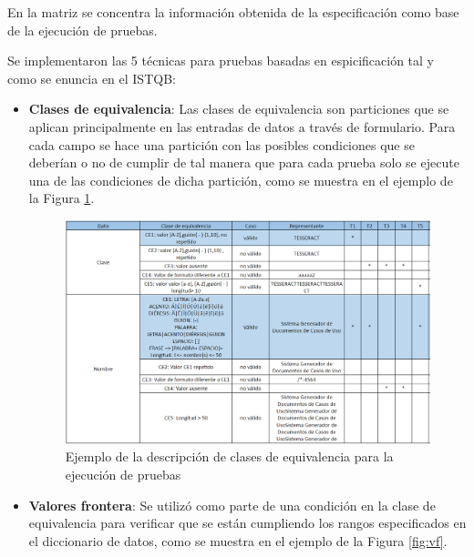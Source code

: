 En la matriz se concentra la información obtenida de la especificación como base de la ejecución de pruebas.\\

\newpage

Se implementaron las 5 técnicas para pruebas basadas en espicificación tal y como se enuncia en el ISTQB:

\begin{itemize}
	\item \textbf {Clases de equivalencia}:
	Las clases de equivalencia son particiones que se aplican principalmente en las entradas de datos a través de formulario. Para cada campo se hace una partición con las posibles condiciones que se deberían o no de cumplir de tal manera que para cada prueba solo se ejecute una de las condiciones de dicha partición, como se muestra en el ejemplo de la Figura \ref{fig:cee}.
	
	\begin{figure}[H]
		\begin{center}
			\includegraphics[width=1\textwidth]{images/pruebas/diseno/claseequivalencia}
			\caption{Ejemplo de la descripción de clases de equivalencia para la ejecución de pruebas}
			\label{fig:cee}
		\end{center}
	\end{figure}
	
	\item \textbf {Valores frontera}:
	Se utilizó como parte de una condición en la clase de equivalencia para verificar que se están cumpliendo los rangos especificados en el diccionario de datos, como se muestra en el ejemplo de la Figura \ref{fig:vf}.
	

\end{itemize}
